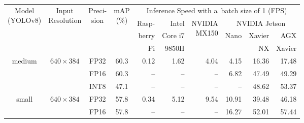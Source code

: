 \begin{appendices}
\begin{table}[h]
    \footnotesize
    \centering
    \begin{threeparttable}
        \begin{tabular}{|c|c|c|c|rrrrrr|}
            \hline
            \multirow{4}{*}{\parbox{1.6cm}{\centering Model\\(YOLOv8)}} &
            \multirow{4}{*}{\parbox{1.5cm}{\centering Input\\Resolution}} &
                \multirow{4}{*}{\parbox{0.9cm}{\centering Preci-\\sion}} &
                \multirow{4}{*}{\parbox{0.8cm}{\centering mAP\\(\%)}} &
                    \multicolumn{6}{c|}{Inference Speed with a~batch size of 1 (FPS)} \\
            \cline{5-10}
            & & & & Rasp- & Intel   &\multirow{3}{*}{\parbox{1.2cm}{\raggedleft NVIDIA\\MX150}} & \multicolumn{3}{|c|}{NVIDIA Jetson} \\
            \cline{8-10}
            & & & & berry & Core i7 &                                                           & \multicolumn{1}{|c}{\multirow{2}{*}{Nano}} & Xavier & AGX \\
            & & & & Pi    & 9850H   &                                                           & \multicolumn{1}{|c}{}                      & NX     & Xavier \\
            \hline
            \hline
            \multirow{3}{*}{medium}                                   & \multirow{3}{*}{$640 \times 384$} & FP32 & 60.3 &  0.12 &   1.62 &  4.04 &  4.15 & 16.36 &  17.48 \\
                                                                    &                                   & FP16 & 60.3 &    -- &     -- &    -- &  6.82 & 47.49 &  49.29 \\
                                                                    &                                   & INT8 & 47.1 &    -- &     -- &    -- &    -- & 48.62 &  53.37 \\
            \hline
            \multirow{3}{*}{small}                                    & \multirow{3}{*}{$640 \times 384$} & FP32 & 57.8 &  0.34 &   5.12 &  9.54 & 10.91 & 39.48 &  46.18 \\
                                                                    &                                   & FP16 & 57.8 &    -- &     -- &    -- & 16.27 & 52.01 &  57.44 \\

\end{tabular}
\end{threeparttable}
\end{table}
\end{appendices}
